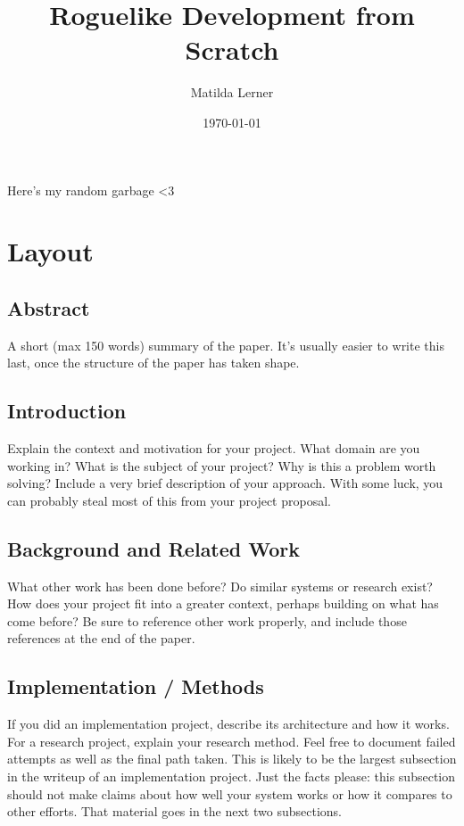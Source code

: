 \documentclass[sigconf,nonacm]{acmart}
\begin{document}
\title{Roguelike Development from Scratch}
\author{Matilda Lerner}
\date{\today}
\maketitle

\tableofcontents
\newpage
{}

Here's my random garbage <3

\newpage
\section{Layout}

\subsection{Abstract}
A short (max 150 words) summary of the paper. It’s usually easier to write this last, once the structure of the paper has taken shape.

\subsection{Introduction}
Explain the context and motivation for your project. What domain are you working in? What is the subject of your project? Why is this a problem worth solving? Include a very brief description of your approach. With some luck, you can probably steal most of this from your project proposal.

\subsection{Background and Related Work}
What other work has been done before? Do similar systems or research exist? How does your project fit into a greater context, perhaps building on what has come before? Be sure to reference other work properly, and include those references at the end of the paper.

\subsection{Implementation / Methods}
If you did an implementation project, describe its architecture and how it works. For a research project, explain your research method. Feel free to document failed attempts as well as the final path taken. This is likely to be the largest subsection in the writeup of an implementation project. Just the facts please: this subsection should not make claims about how well your system works or how it compares to other efforts. That material goes in the next two subsections.
\end{document}
